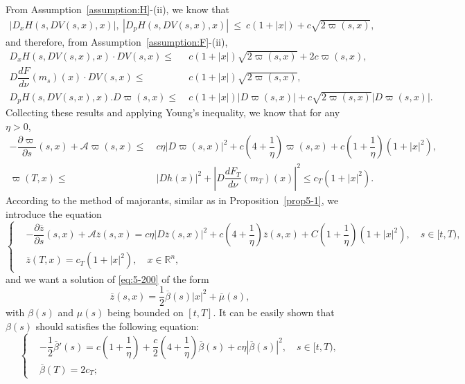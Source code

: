 \documentclass[11pt]{article}
\numberwithin{equation}{section}
\newcommand{\brn}{{\mathbb{R}^n}}
\newcommand{\1}{\mbox{1\hspace{-1mm}I}}
\begin{document}
From Assumption~\ref{assumption:H}-(ii), we know that 
\begin{align*}
    |D_{x}H(s,DV(s,x),x)|,\ |D_{p}H(s,DV(s,x),x)|\ \le\  c(1+|x|)+c\sqrt{2\varpi(s,x)}, 
\end{align*}
and therefore, from Assumption~\ref{assumption:F}-(ii),
\begin{align*}
    D_{x}H(s,DV(s,x),x)\cdot DV(s,x)\le\ &  c(1+|x|)\sqrt{2\varpi(s,x)}+2c\varpi(s,x),\\
    D\dfrac{dF}{d\nu}\left(m_s\right)(x)\cdot DV(s,x)\le\ & c(1+|x|)\sqrt{2\varpi(s,x)},\\
    D_{p}H(s,DV(s,x),x).D\varpi(s,x)\le\ & c(1+|x|)|D\varpi(s,x)|+c\sqrt{2\varpi(s,x)}|D\varpi(s,x)|.
\end{align*}
Collecting these results and applying Young's inequality, we know that for any $\eta>0$,
\begin{equation}\label{eq:5-40}
\begin{aligned}
    -\dfrac{\partial \varpi}{\partial s}(s,x)+\mathcal{A}\varpi(s,x)\le\ &  c\eta|D\varpi(s,x)|^{2}+c\left(4+\dfrac{1}{\eta}\right)\varpi(s,x)+c\left(1+\dfrac{1}{\eta}\right)\left(1+|x|^{2}\right),\\
    \varpi(T,x)\le\ & |Dh(x)|^{2}+\left|D\dfrac{dF_{T}}{d\nu}(m_T)(x)\right|^{2}\leq c_T(1+|x|^{2}).
\end{aligned}
\end{equation}
According to the method of majorants, similar as in Proposition~\ref{prop5-1}, we introduce the equation 
\begin{equation}\label{eq:5-200}
\left\{
\begin{aligned}
    &-\dfrac{\partial \overline{z}}{\partial s}(s,x)+\mathcal{A}\overline{z}(s,x)=c\eta|D\overline{z}(s,x)|^{2}+c\left(4+\dfrac{1}{\eta}\right)\overline{z}(s,x)+C\left(1+\dfrac{1}{\eta}\right)\left(1+|x|^{2}\right),\quad s\in[t,T),\\
    &\overline{z}(T,x)=c_T \left(1+|x|^{2}\right),\quad x\in\brn,
\end{aligned}
\right.
\end{equation}
and we want a solution of \eqref{eq:5-200} of the form
\begin{equation}\label{eq:5-201}
    \overline{z}(s,x)=\dfrac{1}{2}\overline{\beta}(s)|x|^{2}+\overline{\mu}(s),
\end{equation}
with $\beta(s)$ and $\mu(s)$ being bounded on $[t,T]$. It can be easily shown that $\beta(s)$ should satisfies the following equation:
\begin{equation}\label{eq:5-202}
    \left\{
    \begin{aligned}
        &-\dfrac{1}{2}\overline{\beta}'(s)=c\left(1+\dfrac{1}{\eta}\right)+\dfrac{c}{2}\left(4+\dfrac{1}{\eta}\right)\overline{\beta}(s)+c\eta\left|\overline{\beta}(s)\right|^{2},\quad s\in[t,T),\\
        &\overline{\beta}(T)=2c_T;
    \end{aligned}
    \right.
\end{equation}
\end{document}
